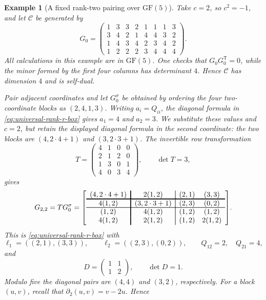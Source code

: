 \documentclass[12pt]{article}
\newtheorem{example}{Example}[section]
\newcommand{\GF}[1]{\ensuremath{\mathrm{GF}(#1)}}
\begin{document}
\begin{example}[A fixed rank-two pairing over \(\GF{5}\)]
\label{ex:rank-two-gf5}
\rm
Take \(c=2\), so \(c^2=-1\), and let \(\mathcal C\) be generated by
\[
G_0=\begin{pmatrix}
1&3&3&2&1&1&1&3\\
3&4&2&1&4&4&3&2\\
1&4&3&4&2&3&4&2\\
1&2&2&2&3&4&4&4
\end{pmatrix}.
\]
All calculations in this example are in \(\GF{5}\). One checks that
\(G_0G_0^{\mathsf T}=0\), while the minor formed by the first four columns
has determinant \(4\). Hence \(\mathcal C\) has dimension \(4\) and is self-dual.

Pair adjacent coordinates and let \(G_0^\sigma\) be obtained by ordering the
four two-coordinate blocks as \((2,4,1,3)\). Writing
\(a_i=Q_{ii}\), the diagonal formula in
\eqref{eq:universal-rank-r-box} gives \(a_1=4\) and \(a_2=3\). We
substitute these values and \(c=2\), but retain the displayed diagonal
formula in the second coordinate: the two blocks are
\((4,2\cdot4+1)\) and \((3,2\cdot3+1)\). The invertible row transformation
\[
T=\begin{pmatrix}
4&1&0&0\\
2&1&2&0\\
1&3&0&1\\
4&0&3&4
\end{pmatrix},\qquad \det T=3,
\]
gives
\[
G_{2,2}=TG_0^\sigma=
{\arrayrulewidth=1.2pt
\left[\begin{array}{c!{\vrule width 1.2pt}c!{\vrule width 0.6pt}cc}
(4,2\cdot4+1)&\multicolumn{1}{c!{\vrule width 0.6pt}}{2(1,2)}&(2,1)&(3,3)\\[-1pt]
\noalign{\hrule height 1.2pt}
4(1,2)&(3,2\cdot3+1)&(2,3)&(0,2)\\[-1pt]
\noalign{\hrule height 0.6pt}
(1,2)&4(1,2)&(1,2)&(1,2)\\
4(1,2)&2(1,2)&(1,2)&2(1,2)
\end{array}\right]}.
\]
This is \eqref{eq:universal-rank-r-box} with
\[
\ell_1=((2,1),(3,3)),\qquad
\ell_2=((2,3),(0,2)),\qquad
Q_{12}=2,\quad Q_{21}=4,
\]
and
\[
D=\begin{pmatrix}1&1\\1&2\end{pmatrix},\qquad \det D=1.
\]
Modulo five the diagonal pairs are \((4,4)\) and \((3,2)\), respectively.
For a block \((u,v)\), recall that \(\partial_2(u,v)=v-2u\).  Hence
\[
\begin{aligned}

\end{aligned}\]
\end{example}
\end{document}
